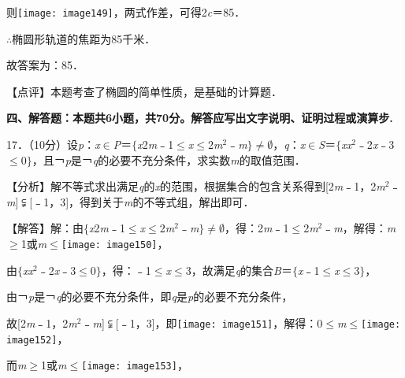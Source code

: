 \documentclass[a4paper,11pt,UTF8,twoside]{ctexart} %
\begin{document}
则\texttt{[image: image149]}，两式作差，可得2\textit{c}＝85．

$\mathrm{\therefore}$椭圆形轨道的焦距为85千米．

故答案为：85．

【点评】本题考查了椭圆的简单性质，是基础的计算题．

\textbf{四、解答题：本题共6小题，共70分。解答应写出文字说明、证明过程或演算步.}

17．（10分）设\textit{p}：\textit{x}$\mathrm{\in }$\textit{P}＝$\mathrm{\{}$\textit{x}{\textbar}2\textit{m}﹣1$\mathrm{\le}$\textit{x}$\mathrm{\le}$2\textit{m}${}^{2}$﹣\textit{m}$\mathrm{\}}$$\mathrm{\neq}$$\mathrm{\emptyset }$，\textit{q}：\textit{x}$\mathrm{\in }$\textit{S}＝$\mathrm{\{}$\textit{x}{\textbar}\textit{x}${}^{2}$﹣2\textit{x}﹣3$\mathrm{\le}$0$\mathrm{\}}$，且￢\textit{p}是￢\textit{q}的必要不充分条件，求实数\textit{m}的取值范围．

【分析】解不等式求出满足\textit{q}的\textit{x}的范围，根据集合的包含关系得到[2\textit{m}﹣1，2\textit{m}${}^{2}$﹣\textit{m}]$\mathrm{\subsetneqq}$[﹣1，3]，得到关于\textit{m}的不等式组，解出即可．

【解答】解：由$\mathrm{\{}$\textit{x}{\textbar}2\textit{m}﹣1$\mathrm{\le}$\textit{x}$\mathrm{\le}$2\textit{m}${}^{2}$﹣\textit{m}$\mathrm{\}}$$\mathrm{\neq}$$\mathrm{\emptyset }$，得：2\textit{m}﹣1$\mathrm{\le}$2\textit{m}${}^{2}$﹣\textit{m}，解得：\textit{m}$\mathrm{\ge}$1或\textit{m}$\mathrm{\le}$\texttt{[image: image150]}，

由$\mathrm{\{}$\textit{x}{\textbar}\textit{x}${}^{2}$﹣2\textit{x}﹣3$\mathrm{\le}$0$\mathrm{\}}$，得：﹣1$\mathrm{\le}$\textit{x}$\mathrm{\le}$3，故满足\textit{q}的集合\textit{B}＝$\mathrm{\{}$\textit{x}{\textbar}﹣1$\mathrm{\le}$\textit{x}$\mathrm{\le}$3$\mathrm{\}}$，

由￢\textit{p}是￢\textit{q}的必要不充分条件，即\textit{q}是\textit{p}的必要不充分条件，

故[2\textit{m}﹣1，2\textit{m}${}^{2}$﹣\textit{m}]$\mathrm{\subsetneqq}$[﹣1，3]，即\texttt{[image: image151]}，解得：0$\mathrm{\le}$\textit{m}$\mathrm{\le}$\texttt{[image: image152]}，

而\textit{m}$\mathrm{\ge}$1或\textit{m}$\mathrm{\le}$\texttt{[image: image153]}，
\end{document}
